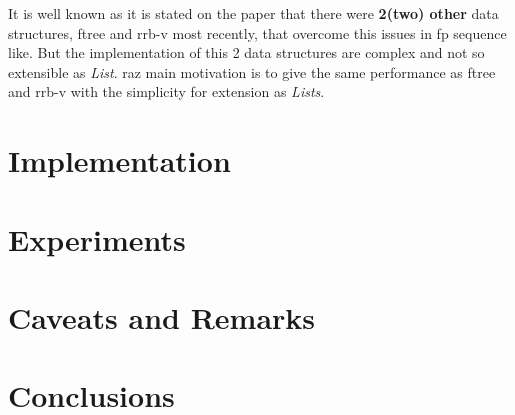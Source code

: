 \documentclass[12pt, a4paper]{article}
\begin{document}
It is well known as it is stated on the paper that there were \textbf{2(two) other} data structures, \acrfull{ftree} and \acrfull{rrb-v} most recently, that overcome this issues in \acrshort{fp} sequence like. But the implementation of this 2 data structures are complex and not so extensible as \textit{List}. \acrshort{raz} main motivation is to give the same performance as \acrshort{ftree} and \acrshort{rrb-v} with the simplicity for extension as \textit{Lists}.

\section{Implementation}
%
%
%
%
%
%
%
%


\section{Experiments}

\section{Caveats and Remarks}

\section{Conclusions}
\end{document}
